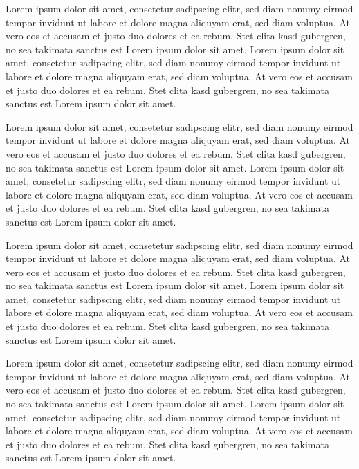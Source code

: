 \documentclass[11pt,a4paper,british]{article}
\begin{document}
Lorem ipsum dolor sit amet, consetetur sadipscing elitr, sed diam nonumy eirmod tempor invidunt ut labore et dolore magna aliquyam erat, sed diam voluptua. At vero eos et accusam et justo duo dolores et ea rebum. Stet clita kasd gubergren, no sea takimata sanctus est Lorem ipsum dolor sit amet. Lorem ipsum dolor sit amet, consetetur sadipscing elitr, sed diam nonumy eirmod tempor invidunt ut labore et dolore magna aliquyam erat, sed diam voluptua. At vero eos et accusam et justo duo dolores et ea rebum. Stet clita kasd gubergren, no sea takimata sanctus est Lorem ipsum dolor sit amet.

Lorem ipsum dolor sit amet, consetetur sadipscing elitr, sed diam nonumy eirmod tempor invidunt ut labore et dolore magna aliquyam erat, sed diam voluptua. At vero eos et accusam et justo duo dolores et ea rebum. Stet clita kasd gubergren, no sea takimata sanctus est Lorem ipsum dolor sit amet. Lorem ipsum dolor sit amet, consetetur sadipscing elitr, sed diam nonumy eirmod tempor invidunt ut labore et dolore magna aliquyam erat, sed diam voluptua. At vero eos et accusam et justo duo dolores et ea rebum. Stet clita kasd gubergren, no sea takimata sanctus est Lorem ipsum dolor sit amet.

Lorem ipsum dolor sit amet, consetetur sadipscing elitr, sed diam nonumy eirmod tempor invidunt ut labore et dolore magna aliquyam erat, sed diam voluptua. At vero eos et accusam et justo duo dolores et ea rebum. Stet clita kasd gubergren, no sea takimata sanctus est Lorem ipsum dolor sit amet. Lorem ipsum dolor sit amet, consetetur sadipscing elitr, sed diam nonumy eirmod tempor invidunt ut labore et dolore magna aliquyam erat, sed diam voluptua. At vero eos et accusam et justo duo dolores et ea rebum. Stet clita kasd gubergren, no sea takimata sanctus est Lorem ipsum dolor sit amet.

Lorem ipsum dolor sit amet, consetetur sadipscing elitr, sed diam nonumy eirmod tempor invidunt ut labore et dolore magna aliquyam erat, sed diam voluptua. At vero eos et accusam et justo duo dolores et ea rebum. Stet clita kasd gubergren, no sea takimata sanctus est Lorem ipsum dolor sit amet. Lorem ipsum dolor sit amet, consetetur sadipscing elitr, sed diam nonumy eirmod tempor invidunt ut labore et dolore magna aliquyam erat, sed diam voluptua. At vero eos et accusam et justo duo dolores et ea rebum. Stet clita kasd gubergren, no sea takimata sanctus est Lorem ipsum dolor sit amet.

\printbibliography
\end{document}
